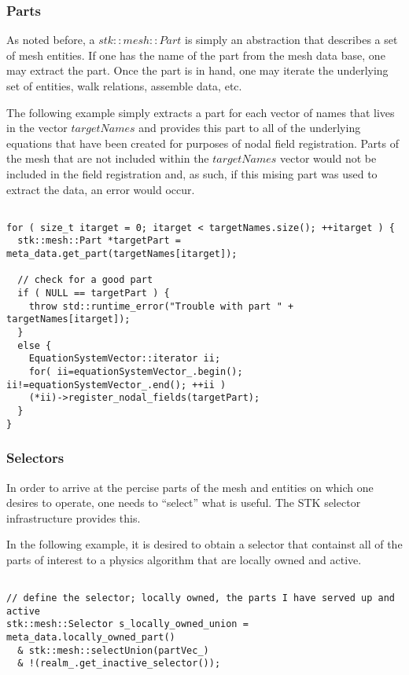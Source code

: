 \subsubsection{Parts}
As noted before, a $stk::mesh::Part$ is simply an abstraction that describes a 
set of mesh entities. If one has the name of the part from the mesh data base,
one may extract the part. Once the part is in hand, one may iterate the underlying set of
entities, walk relations, assemble data, etc.

The following example simply extracts a part for each vector of names that lives in
the vector $targetNames$ and provides this part to all of the underlying equations
that have been created for purposes of nodal field registration. Parts of the mesh
that are not included within the $targetNames$ vector would not be included in the 
field registration and, as such, if this mising part was used to extract the data, an 
error would occur.

\begin{lstlisting}

for ( size_t itarget = 0; itarget < targetNames.size(); ++itarget ) {
  stk::mesh::Part *targetPart = meta_data.get_part(targetNames[itarget]);

  // check for a good part
  if ( NULL == targetPart ) {
    throw std::runtime_error("Trouble with part " + targetNames[itarget]);
  }
  else {
    EquationSystemVector::iterator ii;
    for( ii=equationSystemVector_.begin(); ii!=equationSystemVector_.end(); ++ii )
    (*ii)->register_nodal_fields(targetPart);
  }
}

\end{lstlisting}

\subsubsection{Selectors}
In order to arrive at the percise parts of the mesh and entities on which one desires
to operate, one needs to ``select'' what is useful. The STK selector infrastructure provides this.

In the following example, it is desired to obtain a selector that containst all of the parts of 
interest to a physics algorithm that are locally owned and active.

\begin{lstlisting}

// define the selector; locally owned, the parts I have served up and active
stk::mesh::Selector s_locally_owned_union = meta_data.locally_owned_part()
  & stk::mesh::selectUnion(partVec_) 
  & !(realm_.get_inactive_selector());

\end{lstlisting}

